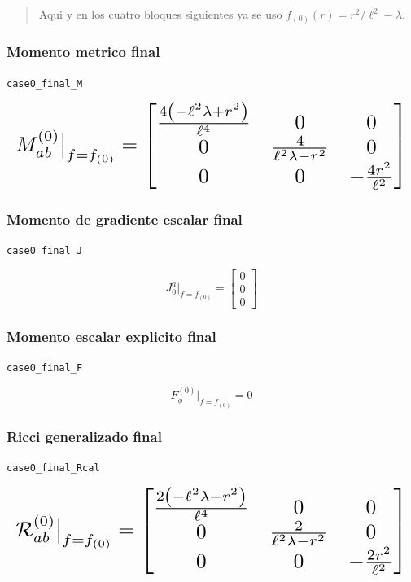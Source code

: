 \documentclass[11pt,a4paper]{article}
\begin{document}
\begin{quote}\small Aqui y en los cuatro bloques siguientes ya se uso \(f_{(0)}(r)=r^2/\ell^2-\lambda\).\end{quote}

\subsubsection{Momento metrico final}

\noindent\texttt{case0\_final\_M}\par\nopagebreak[4]

\[
\resizebox{\textwidth}{!}{$\displaystyle M^{(0)}_{ab}\big|_{f=f_{(0)}} = \left[\begin{matrix}\frac{4 \left(- \ell^{2} \lambda + r^{2}\right)}{\ell^{4}} & 0 & 0\\0 & \frac{4}{\ell^{2} \lambda - r^{2}} & 0\\0 & 0 & - \frac{4 r^{2}}{\ell^{2}}\end{matrix}\right]$}
\]

\subsubsection{Momento de gradiente escalar final}

\noindent\texttt{case0\_final\_J}\par\nopagebreak[4]

\[
J_0^a\big|_{f=f_{(0)}} = \left[\begin{matrix}0\\0\\0\end{matrix}\right]
\]

\subsubsection{Momento escalar explicito final}

\noindent\texttt{case0\_final\_F}\par\nopagebreak[4]

\[
F_\phi^{(0)}\big|_{f=f_{(0)}} = 0
\]

\subsubsection{Ricci generalizado final}

\noindent\texttt{case0\_final\_Rcal}\par\nopagebreak[4]

\[
\resizebox{\textwidth}{!}{$\displaystyle \mathcal R^{(0)}_{ab}\big|_{f=f_{(0)}} = \left[\begin{matrix}\frac{2 \left(- \ell^{2} \lambda + r^{2}\right)}{\ell^{4}} & 0 & 0\\0 & \frac{2}{\ell^{2} \lambda - r^{2}} & 0\\0 & 0 & - \frac{2 r^{2}}{\ell^{2}}\end{matrix}\right]$}
\]
\end{document}
